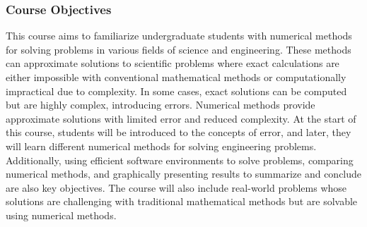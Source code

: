 \documentclass[12pt]{article}
\begin{document}
\subsubsection*{Course Objectives}
This course aims to familiarize undergraduate students with numerical methods for solving problems in various fields of science and engineering. These methods can approximate solutions to scientific problems where exact calculations are either impossible with conventional mathematical methods or computationally impractical due to complexity. In some cases, exact solutions can be computed but are highly complex, introducing errors. Numerical methods provide approximate solutions with limited error and reduced complexity. At the start of this course, students will be introduced to the concepts of error, and later, they will learn different numerical methods for solving engineering problems. Additionally, using efficient software environments to solve problems, comparing numerical methods, and graphically presenting results to summarize and conclude are also key objectives. The course will also include real-world problems whose solutions are challenging with traditional mathematical methods but are solvable using numerical methods.
\end{document}

